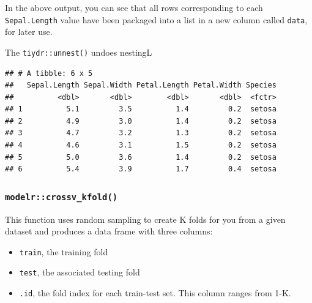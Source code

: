 \documentclass[]{article}
\newenvironment{Shaded}{\begin{snugshade}}{\end{snugshade}}
\newcommand{\KeywordTok}[1]{\textcolor[rgb]{0.13,0.29,0.53}{\textbf{#1}}}
\newcommand{\DecValTok}[1]{\textcolor[rgb]{0.00,0.00,0.81}{#1}}
\newcommand{\StringTok}[1]{\textcolor[rgb]{0.31,0.60,0.02}{#1}}
\newcommand{\OperatorTok}[1]{\textcolor[rgb]{0.81,0.36,0.00}{\textbf{#1}}}
\newcommand{\NormalTok}[1]{#1}
\providecommand{\tightlist}{%
  \setlength{\itemsep}{0pt}\setlength{\parskip}{0pt}}
\begin{document}
In the above output, you can see that all rows corresponding to each
\texttt{Sepal.Length} value have been packaged into a list in a new
column called \texttt{data}, for later use.

The \texttt{tiydr::unnest()} undoes nestingL

\begin{Shaded}
\end{Shaded}

\begin{verbatim}
## # A tibble: 6 x 5
##   Sepal.Length Sepal.Width Petal.Length Petal.Width Species
##          <dbl>       <dbl>        <dbl>       <dbl>  <fctr>
## 1          5.1         3.5          1.4         0.2  setosa
## 2          4.9         3.0          1.4         0.2  setosa
## 3          4.7         3.2          1.3         0.2  setosa
## 4          4.6         3.1          1.5         0.2  setosa
## 5          5.0         3.6          1.4         0.2  setosa
## 6          5.4         3.9          1.7         0.4  setosa
\end{verbatim}

\subsubsection{\texorpdfstring{\texttt{modelr::crossv\_kfold()}}{modelr::crossv\_kfold()}}\label{modelrcrossv_kfold}

This function uses random sampling to create K folds for you from a
given dataset and produces a data frame with three columns:

\begin{itemize}
\tightlist
\item
  \texttt{train}, the training fold
\item
  \texttt{test}, the associated testing fold
\item
  \texttt{.id}, the fold index for each train-test set. This column
  ranges from 1-K.
\end{itemize}

\begin{Shaded}
\end{Shaded}
\end{document}
